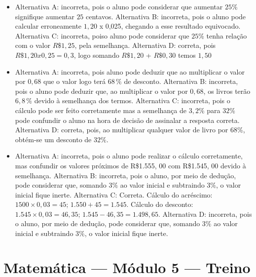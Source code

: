 \begin{itemize}
\item Alternativa A: incorreta, pois o aluno pode considerar que aumentar $25\%$
signifique aumentar $25$ centavos.
Alternativa B: incorreta, pois o aluno pode calcular erroneamente $1,20$ x
0,025, chegando a esse resultado equivocado.
Alternativa C: incorreta, poiso aluno pode considerar que $25\%$ tenha
relação com o valor $R\$1,25$, pela semelhança.
Alternativa D: correta, pois $R\$1,20 x 0,25 = 0,3$, logo somando $R\$1,20$
+ $R\$0,30$ temos $1,50$
\item Alternativa A: incorreta, pois aluno pode deduzir que ao multiplicar o
valor por $0,68$ que o valor logo terá $68\,\%$ de desconto.
Alternativa B: incorreta, pois o aluno pode deduzir que, ao multiplicar
o valor por $0,68$, os livros terão $6,8\,\%$ devido à semelhança dos termos.
Alternativa C: incorreta, pois o cálculo pode ser feito corretamente mas
a semelhança de $3,2\%$ para $32\%$ pode confundir o aluno na hora de
decisão de assinalar a resposta correta.
Alternativa D: correta, pois, ao multiplicar qualquer valor de livro por
68\%, obtém-se um desconto de $32\%$.
\item Alternativa A: incorreta, pois o aluno pode realizar o cálculo
corretamente, mas confundir os valores próximos de R\$1.555, $00$ com
R\$1.545, $00$ devido à semelhança.
Alternativa B: incorreta, pois o aluno, por meio de dedução, pode
considerar que, somando $3\%$ ao valor inicial e subtraindo $3\%$, o valor
inicial fique inerte.
Alternativa C: Correta. Cálculo do acréscimo: $1500\times 0,03 = 45$; $1.550 + 45 = 1.545$. Cálculo do desconto: $1.545\times 0,03 = 46,35$; $1.545 - 46,35 = 1.498,65$.
Alternativa D: incorreta, pois o aluno, por meio de dedução, pode
considerar que, somando $3\%$ ao valor inicial e subtraindo $3\%$, o valor
inicial fique inerte.
\end{itemize}

\section*{Matemática — Módulo 5 — Treino}

